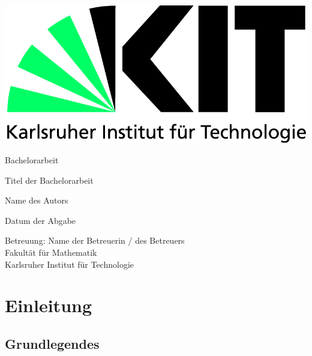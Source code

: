 \documentclass[12pt,a4paper]{scrartcl}
\numberwithin{equation}{section}
\begin{document}
  \pagestyle{empty}

  \begin{titlepage}

    \includegraphics[scale=0.45]{kit-logo.jpg}
    \vspace*{2cm} 

 \begin{center} \large 
    
    Bachelorarbeit
    \vspace*{2cm}

    {\huge Titel der Bachelorarbeit}
    \vspace*{2.5cm}

    Name des Autors
    \vspace*{1.5cm}

    Datum der Abgabe
    \vspace*{4.5cm}


    Betreuung: Name der Betreuerin / des Betreuers \\[1cm]
    Fakult\"at für Mathematik \\[1cm]
		Karlsruher Institut für Technologie
  \end{center}
\end{titlepage}


  \tableofcontents

\newpage

  \pagestyle{headings}

\section{Einleitung}

\subsection{Grundlegendes}
\end{document}
